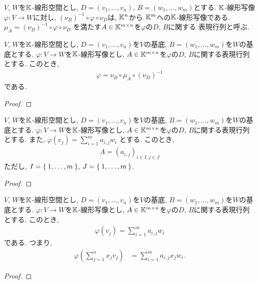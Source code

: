 \begin{definition}
  $V$, $W$を$\mathbb{K}$-線形空間とし,
  $D=(v_1,\ldots,v_n)$,
  $B=(w_1,\ldots,w_m)$とする.
  $\mathbb{K}$-線形写像$\varphi\colon V\to W$に対し,
  $(\nu_B)^{-1}\circ \varphi\circ \nu_D$は,
  $\mathbb{K}^n$から $\mathbb{K}^m$への$\mathbb{K}$-線形写像である.
  $\mu_A=(\nu_B)^{-1}\circ \varphi\circ \nu_D$
  を満たす$A\in\mathbb{K}^{m\times n}$を$\varphi$の$D$, $B$に関する
  表現行列と呼ぶ.
\end{definition}
\begin{prop}
  $V$, $W$を$\mathbb{K}$-線形空間とし,
  $D=(v_1,\ldots,v_n)$を$V$の基底,
  $B=(w_1,\ldots,w_m)$を$W$の基底とする.
  $\varphi\colon V\to W$を$\mathbb{K}$-線形写像とし,
  $A\in\mathbb{K}^{m\times n}$を$\varphi$の$D$, $B$に関する表現行列とする.
このとき,
\begin{align*}
  \varphi=\nu_B\circ \mu_A\circ (\nu_{D})^{-1}
\end{align*}
である.
\end{prop}
\begin{proof}\end{proof}

\begin{prop}
  $V$, $W$を$\mathbb{K}$-線形空間とし,
  $D=(v_1,\ldots,v_n)$を$V$の基底,
  $B=(w_1,\ldots,w_m)$を$W$の基底とする.
  $\varphi\colon V\to W$を$\mathbb{K}$-線形写像とし,
  $A\in\mathbb{K}^{m\times n}$を$\varphi$の$D$, $B$に関する表現行列とする.
  また,
  $\varphi(v_j)=\sum_{i=1}^m a_{i,j} w_i$
  とする.
  このとき,
\begin{align*}
  A=(a_{i,j})_{i\in I, j\in J}
\end{align*}
ただし,
$I=\Set{1,\ldots,m}$,
$J=\Set{1,\ldots,m}$.
\end{prop}
\begin{proof}\end{proof}


\begin{prop}
  $V$, $W$を$\mathbb{K}$-線形空間とし,
  $D=(v_1,\ldots,v_n)$を$V$の基底,
  $B=(w_1,\ldots,w_m)$を$W$の基底とする.
  $\varphi\colon V\to W$を$\mathbb{K}$-線形写像とし,
  $A\in\mathbb{K}^{m\times n}$を$\varphi$の$D$, $B$に関する表現行列とする.
このとき,
\begin{align*}
  \varphi(v_j)=\sum_{i=1}^m a_{i,j}w_i
\end{align*}
である.
つまり,
\begin{align*}
  \varphi(\sum_{j=1}^n x_j v_j)
  &=\sum_{i=1}^m a_{i,j}x_jw_i.
\end{align*}
\end{prop}
\begin{proof}\end{proof}


